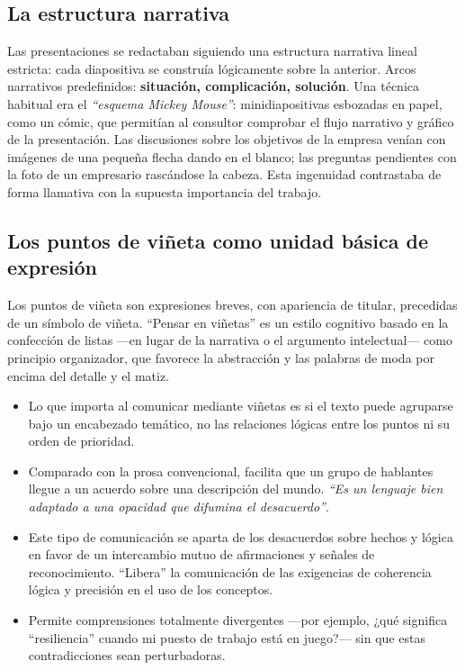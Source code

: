 \documentclass[a4paper,12pt]{article}
\begin{document}
\subsection*{La estructura narrativa}

Las presentaciones se redactaban siguiendo una estructura narrativa lineal estricta: cada diapositiva se construía lógicamente sobre la anterior. Arcos narrativos predefinidos: \textbf{situación, complicación, solución}. Una técnica habitual era el \textit{``esquema Mickey Mouse''}: minidiapositivas esbozadas en papel, como un cómic, que permitían al consultor comprobar el flujo narrativo y gráfico de la presentación. Las discusiones sobre los objetivos de la empresa venían con imágenes de una pequeña flecha dando en el blanco; las preguntas pendientes con la foto de un empresario rascándose la cabeza. Esta ingenuidad contrastaba de forma llamativa con la supuesta importancia del trabajo.

\subsection*{Los puntos de viñeta como unidad básica de expresión}

Los puntos de viñeta son expresiones breves, con apariencia de titular, precedidas de un símbolo de viñeta. ``Pensar en viñetas'' es un estilo cognitivo basado en la confección de listas ---en lugar de la narrativa o el argumento intelectual--- como principio organizador, que favorece la abstracción y las palabras de moda por encima del detalle y el matiz.

\begin{itemize}
  \item Lo que importa al comunicar mediante viñetas es si el texto puede agruparse bajo un encabezado temático, no las relaciones lógicas entre los puntos ni su orden de prioridad.
  \item Comparado con la prosa convencional, facilita que un grupo de hablantes llegue a un acuerdo sobre una descripción del mundo. \textit{``Es un lenguaje bien adaptado a una opacidad que difumina el desacuerdo''}.
  \item Este tipo de comunicación se aparta de los desacuerdos sobre hechos y lógica en favor de un intercambio mutuo de afirmaciones y señales de reconocimiento. ``Libera'' la comunicación de las exigencias de coherencia lógica y precisión en el uso de los conceptos.
  \item Permite comprensiones totalmente divergentes ---por ejemplo, ¿qué significa ``resiliencia'' cuando mi puesto de trabajo está en juego?--- sin que estas contradicciones sean perturbadoras.
\end{itemize}
\end{document}

